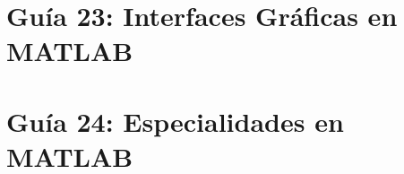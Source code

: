 \documentclass[twoside]{article}
\begin{document}
\newpage

\section*{Guía 23: Interfaces Gráficas en MATLAB}



\newpage

\section*{Guía 24: Especialidades en MATLAB} 















\newpage
% 
% 
\end{document}

